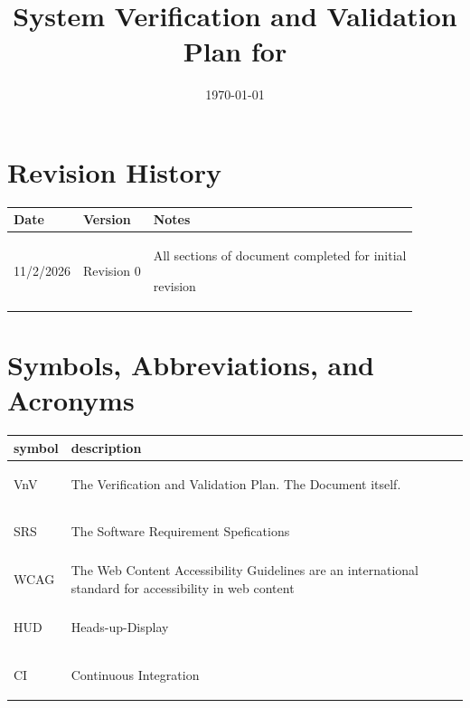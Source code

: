 \documentclass[12pt, titlepage]{article}
\begin{document}
\title{System Verification and Validation Plan for \progname{}} 
\author{\authname}
\date{\today}
	
\maketitle


\section*{Revision History}

\begin{tabularx}{\textwidth}{p{3cm}p{2cm}X}
\toprule {\bf Date} & {\bf Version} & {\bf Notes}\\
\midrule
11/2/2026 & Revision 0 & All sections of document completed for initial 

revision \\
\bottomrule
\end{tabularx}

\newpage

\tableofcontents

\listoftables

\newpage

\section{Symbols, Abbreviations, and Acronyms}

\renewcommand{\arraystretch}{1.2}
\begin{tabular}{l p{12cm}} 
  \toprule		
  \textbf{symbol} & \textbf{description}\\
  \midrule 
  \hypertarget{VnV}{VnV} & The Verification and Validation Plan. The Document itself.\\
  \hypertarget{SRS}{SRS} & The Software Requirement Spefications\\
  \hypertarget{WCAG}{WCAG} & The Web Content Accessibility Guidelines are 
  an international standard for accessibility in web content\\
  \hypertarget{HUD}{HUD} & Heads-up-Display\\
  \hypertarget{CI}{CI} & Continuous Integration\\


  \bottomrule
\end{tabular}\\

\end{document}
